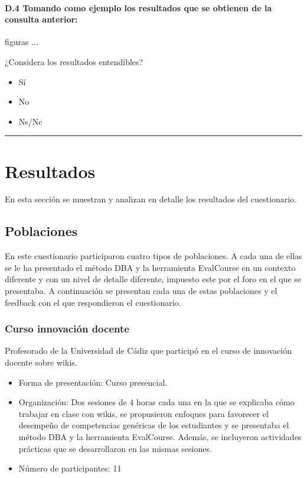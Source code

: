 	\paragraph*{D.4 Tomando como ejemplo los resultados que se obtienen de la consulta anterior:}
	figuras ...
\begin{mdframed}[style=cuestionarioST]
	¿Considera los resultados entendibles?
			\begin{itemize}
				\item Sí
				\item No
				\item Ns/Nc
			\end{itemize}

			\rule{30mm}{1pt} \newline
\end{mdframed}

\newpage

\section{Resultados} \label{apc:eval:metodo:resultados}

En esta sección se muestran y analizan en detalle los resultados del cuestionario. %

\subsection{Poblaciones}

En este cuestionario participaron cuatro tipos de poblaciones. A cada una de ellas se le ha presentado el método DBA y la herramienta EvalCourse en un contexto diferente y con un nivel de detalle diferente, impuesto este por el foro en el que se presentaba. A continuación se presentan cada una de estas poblaciones y el feedback con el que respondieron el cuestionario.

\subsubsection{Curso innovación docente}
Profesorado de la Universidad de Cádiz que participó en el curso de innovación docente sobre wikis.
	\begin{itemize}
		\item{Forma de presentación:} Curso presencial.

		\item{Organización:} Dos sesiones de 4 horas cada una en la que se explicaba cómo trabajar en clase con wikis, se propusieron enfoques para favorecer el desempeño de competencias genéricas de los estudiantes y se presentaba el método DBA y la herramienta EvalCourse.  Además, se incluyeron actividades prácticas que se desarrollaron en las mismas sesiones.

		\item{Número de participantes:} 11
	\end{itemize}


